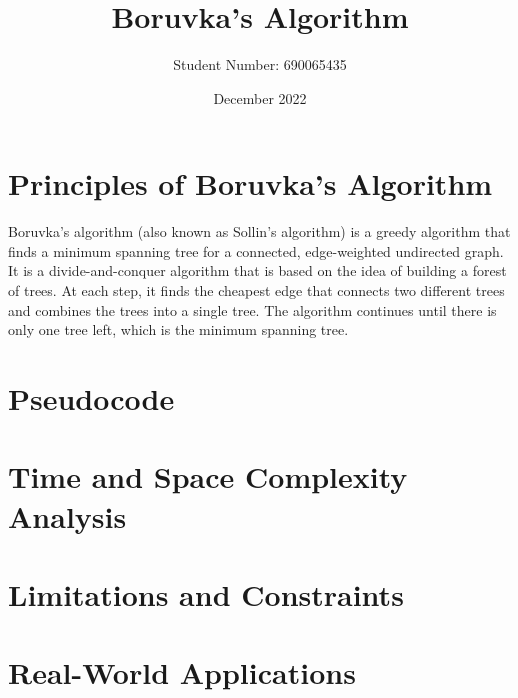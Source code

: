 \documentclass[a4paper, 11pt]{article}
\begin{document}
\title{Boruvka's Algorithm}
\author{Student Number: 690065435}
\date{December 2022}
\maketitle

\section{Principles of Boruvka's Algorithm}
Boruvka's algorithm (also known as Sollin's algorithm) is a greedy algorithm that finds a minimum spanning tree for a connected, edge-weighted undirected graph. It is a divide-and-conquer algorithm that is based on the idea of building a forest of trees. At each step, it finds the cheapest edge that connects two different trees and combines the trees into a single tree. The algorithm continues until there is only one tree left, which is the minimum spanning tree.

\section{Pseudocode}

\section{Time and Space Complexity Analysis}

\section{Limitations and Constraints}

\section{Real-World Applications}



\end{document}
